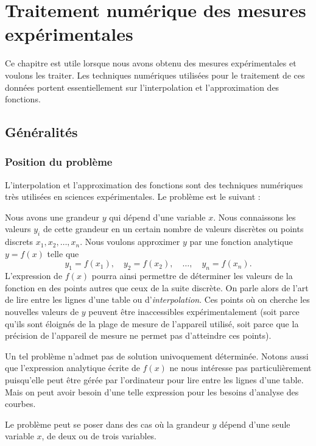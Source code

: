 \chapter{Traitement numérique des mesures expérimentales}

Ce chapitre est utile lorsque nous avons obtenu des mesures expérimentales et
voulons les traiter. Les techniques numériques utilisées pour le traitement de
ces données portent essentiellement sur l'interpolation et l'approximation des
fonctions.

\section{Généralités}

\subsection{Position du problème}

L'interpolation et l'approximation des fonctions sont des techniques
numériques très utilisées en sciences expérimentales. Le problème est le
suivant :

Nous avons une grandeur $y$ qui dépend d'une variable $x$. Nous connaissons
les valeurs $y_i$ de cette grandeur en un certain nombre de valeurs discrètes
ou points discrets $x_1, x_2, \dots, x_n$. Nous voulons approximer $y$ par une
fonction analytique $y = f(x)$ telle que
\[
  y_1 = f(x_1),\quad y_2 = f(x_2),\quad \dots,\quad y_n = f(x_n).
\]
L'expression de $f(x)$ pourra ainsi permettre de déterminer les valeurs de la
fonction en des points autres que ceux de la suite discrète. On parle alors de
l'art de lire entre les lignes d'une table ou d'\emph{interpolation}. Ces
points où on cherche les nouvelles valeurs de $y$ peuvent être inaccessibles
expérimentalement (soit parce qu'ils sont éloignés de la plage de mesure de
l'appareil utilisé, soit parce que la précision de l'appareil de mesure ne
permet pas d'atteindre ces points).

Un tel problème n'admet pas de solution univoquement déterminée. Notons aussi
que l'expression analytique écrite de $f(x)$ ne nous intéresse pas
particulièrement puisqu'elle peut être gérée par l'ordinateur pour lire entre
les lignes d'une table. Mais on peut avoir besoin d'une telle expression pour
les besoins d'analyse des courbes.

Le problème peut se poser dans des cas où la grandeur $y$ dépend d'une seule
variable $x$, de deux ou de trois variables.

